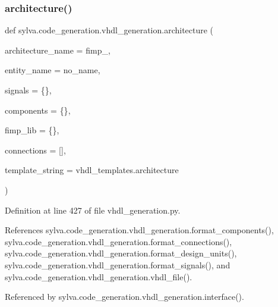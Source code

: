 \subsubsection{\texorpdfstring{architecture()}{architecture()}}
{\footnotesize\ttfamily def sylva.\+code\+\_\+generation.\+vhdl\+\_\+generation.\+architecture (\begin{DoxyParamCaption}\item[{}]{architecture\+\_\+name = {\ttfamily \textquotesingle{}fimp\+\_\textquotesingle{}},  }\item[{}]{entity\+\_\+name = {\ttfamily \textquotesingle{}no\+\_\+name\textquotesingle{}},  }\item[{}]{signals = {\ttfamily \{\}},  }\item[{}]{components = {\ttfamily \{\}},  }\item[{}]{fimp\+\_\+lib = {\ttfamily \{\}},  }\item[{}]{connections = {\ttfamily \mbox{[}\mbox{]}},  }\item[{}]{template\+\_\+string = {\ttfamily vhdl\+\_\+templates.architecture} }\end{DoxyParamCaption})}



Definition at line 427 of file vhdl\+\_\+generation.\+py.



References sylva.\+code\+\_\+generation.\+vhdl\+\_\+generation.\+format\+\_\+components(), sylva.\+code\+\_\+generation.\+vhdl\+\_\+generation.\+format\+\_\+connections(), sylva.\+code\+\_\+generation.\+vhdl\+\_\+generation.\+format\+\_\+design\+\_\+units(), sylva.\+code\+\_\+generation.\+vhdl\+\_\+generation.\+format\+\_\+signals(), and sylva.\+code\+\_\+generation.\+vhdl\+\_\+generation.\+vhdl\+\_\+file().



Referenced by sylva.\+code\+\_\+generation.\+vhdl\+\_\+generation.\+interface().


